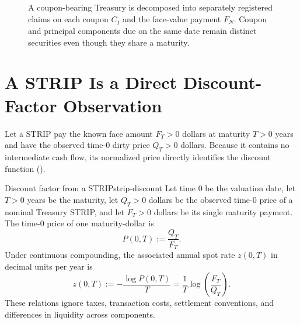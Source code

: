 \documentclass[11pt]{article}
\begin{document}
\begin{figure}[ht]
  \centering
  \caption{A coupon-bearing Treasury is decomposed into separately registered claims on each coupon $C_j$ and the face-value payment $F_N$. Coupon and principal components due on the same date remain distinct securities even though they share a maturity.}
  \label{fig:stripping}
\end{figure}

\section{A STRIP Is a Direct Discount-Factor Observation}

Let a STRIP pay the known face amount $F_T>0$ dollars at maturity $T>0$ years and have the observed time-0 dirty price $Q_T>0$ dollars. Because it contains no intermediate cash flow, its normalized price directly identifies the discount function ().

\begin{definition}{Discount factor from a STRIP}{strip-discount}
Let time 0 be the valuation date, let $T>0$ years be the maturity, let $Q_T>0$ dollars be the observed time-0 price of a nominal Treasury STRIP, and let $F_T>0$ dollars be its single maturity payment. The time-0 price of one maturity-dollar is
\begin{equation}
  \label{eq:strip-discount}
  P(0,T):=\frac{Q_T}{F_T}.
\end{equation}
Under continuous compounding, the associated annual spot rate $z(0,T)$ in decimal units per year is
\begin{equation}
  \label{eq:strip-spot}
  z(0,T):=-\frac{\log P(0,T)}{T}
  =\frac{1}{T}\log\!\left(\frac{F_T}{Q_T}\right).
\end{equation}
These relations ignore taxes, transaction costs, settlement conventions, and differences in liquidity across components.
\end{definition}
\end{document}
